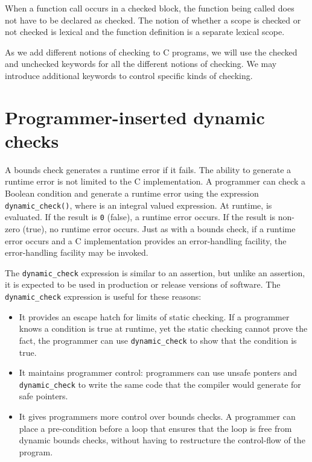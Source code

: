 When a function call occurs in a checked block, the function being
called does not have to be declared as checked. The notion of whether a
scope is checked or not checked is lexical and the function definition
is a separate lexical scope.

As we add different notions of checking to C programs, we will use the
checked and unchecked keywords for all the different notions of
checking. We may introduce additional keywords to control specific kinds
of checking.

\section{Programmer-inserted dynamic checks}

A bounds check generates a runtime error if it fails. The ability to
generate a runtime error is not limited to the C implementation. A
programmer can check a Boolean condition and generate a runtime error
using the expression \texttt{dynamic\_check(}\texttt{)}, where
 is an integral valued expression. At runtime,  is
evaluated. If the result is \texttt{0} (false), a runtime error occurs.
If the result is non-zero (true), no runtime error occurs. Just as with
a bounds check, if a runtime error occurs and a C implementation
provides an error-handling facility, the error-handling facility may be
invoked.

The \texttt{dynamic\_check} expression is similar to an assertion, but
unlike an assertion, it is expected to be used in production or release
versions of software. The \texttt{dynamic\_check} expression is useful
for these reasons:

\begin{itemize}
\item
  It provides an escape hatch for limits of static checking. If a
  programmer knows a condition is true at runtime, yet the static
  checking cannot prove the fact, the programmer can use
  \texttt{dynamic\_check} to show that the condition is true.
\item
  It maintains programmer control: programmers can use unsafe ponters
  and \texttt{dynamic\_check} to write the same code that the compiler
  would generate for safe pointers.
\item
  It gives programmers more control over bounds checks. A programmer can
  place a pre-condition before a loop that ensures that the loop is free
  from dynamic bounds checks, without having to restructure the
  control-flow of the program.
\end{itemize}


